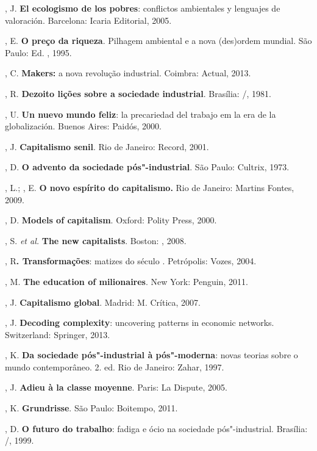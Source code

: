 , J. \textbf{El ecologismo de los pobres}: conflictos ambientales y
lenguajes de valoración. Barcelona: Icaria Editorial, 2005.

, E. \textbf{O preço da riqueza}. Pilhagem ambiental e a nova
(des)ordem mundial. São Paulo: Ed. , 1995.

, C. \textbf{Makers:} a nova revolução industrial. Coimbra:
Actual, 2013.

, R. \textbf{Dezoito lições sobre a sociedade industrial}. Brasília:
/, 1981.

, U. \textbf{Un nuevo mundo feliz}: la precariedad del trabajo em la
era de la globalización. Buenos Aires: Paidós, 2000.

, J. \textbf{Capitalismo senil}. Rio de Janeiro: Record, 2001.

, D. \textbf{O advento da sociedade pós"-industrial}. São Paulo:
Cultrix, 1973.

, L.; , E. \textbf{O novo espírito do capitalismo.}
Rio de Janeiro: Martins Fontes, 2009.

, D. \textbf{Models of capitalism}. Oxford: Polity Press, 2000.

, S. \emph{et al.} \textbf{The new capitalists}. Boston: ,
2008.

, R\textbf{. Transformações}: matizes do século . Petrópolis:
Vozes, 2004.

, M. \textbf{The education of milionaires}. New York: Penguin,
2011.

, J. \textbf{Capitalismo global}. Madrid: M. Crítica, 2007.

, J. \textbf{Decoding complexity}: uncovering patterns in
economic networks. Switzerland: Springer, 2013.

, K. \textbf{Da sociedade pós"-industrial à pós"-moderna}: novas
teorias sobre o mundo contemporâneo. 2. ed. Rio de Janeiro: Zahar, 1997.

, J. \textbf{Adieu à la classe moyenne}. Paris: La Dispute,
2005.

, K. \textbf{Grundrisse}. São Paulo: Boitempo, 2011.

, D. \textbf{O futuro do trabalho}: fadiga e ócio na sociedade
pós"-industrial. Brasília: /, 1999.

